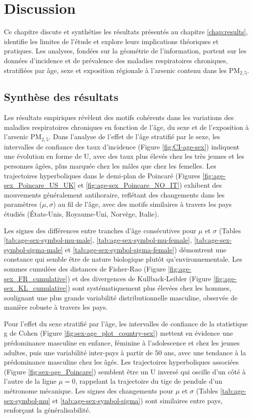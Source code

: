\chapter{Discussion}
\label{chap:discussion}

Ce chapitre discute et synthétise les résultats présentés au chapitre \ref{chap:results}, identifie les limites de l'étude et explore leurs implications théoriques et pratiques. Les analyses, fondées sur la géométrie de l'information, portent sur les données d'incidence et de prévalence des maladies respiratoires chroniques, stratifiées par âge, sexe et exposition régionale à l'arsenic contenu dans les PM$_{2,5}$.

\section{Synthèse des résultats}

Les résultats empiriques révèlent des motifs cohérents dans les variations des maladies respiratoires chroniques en fonction de l'âge, du sexe et de l'exposition à l'arsenic PM$_{2,5}$. Dans l'analyse de l'effet de l'âge stratifié par le sexe, les intervalles de confiance des taux d'incidence (Figure \ref{fig:CI-age-sex}) indiquent une évolution en forme de U, avec des taux plus élevés chez les très jeunes et les personnes âgées, plus marquée chez les mâles que chez les femelles. Les trajectoires hyperboliques dans le demi-plan de Poincaré (Figures \ref{fig:age-sex_Poincare_US_UK} et \ref{fig:age-sex_Poincare_NO_IT}) exhibent des mouvements généralement antihoraire, reflétant des changements dans les paramètres ($\mu, \sigma$) au fil de l'âge, avec des motifs similaires à travers les pays étudiés (États-Unis, Royaume-Uni, Norvège, Italie).

Les signes des différences entre tranches d'âge consécutives pour $\mu$ et $\sigma$ (Tables \ref{tab:age-sex-symbol-mu-male}, \ref{tab:age-sex-symbol-mu-female}, \ref{tab:age-sex-symbol-sigma-male} et \ref{tab:age-sex-symbol-sigma-female}) démontrent une constance qui semble être de nature biologique plutôt qu’environnementale. Les sommes cumulées des distances de Fisher-Rao (Figure \ref{fig:age-sex_FR_cumulative}) et des divergences de Kullback-Leibler (Figure \ref{fig:age-sex_KL_cumulative}) sont systématiquement plus élevées chez les hommes, soulignant une plus grande variabilité distributionnelle masculine, observée de manière robuste à travers les pays.

Pour l'effet du sexe stratifié par l'âge, les intervalles de confiance de la statistique g de Cohen (Figure \ref{fig:sex-age_plot_country-sex}) mettent en évidence une prédominance masculine en enfance, féminine à l'adolescence et chez les jeunes adultes, puis une variabilité inter-pays à partir de 50 ans, avec une tendance à la prédominance masculine chez les âgés. Les trajectoires hyperboliques associées (Figure \ref{fig:sex-age_Poincare}) semblent être un U inversé qui oscille d'un côté à l'autre de la ligne $\mu = 0$, rappelant la trajectoire du tige de pendule d'un métronome mécanique. Les signes des changements pour $\mu$ et $\sigma$ (Tables \ref{tab:age-sex-symbol-mu} et \ref{tab:age-sex-symbol-sigma}) sont similaires entre pays, renforçant la généralisabilité.

